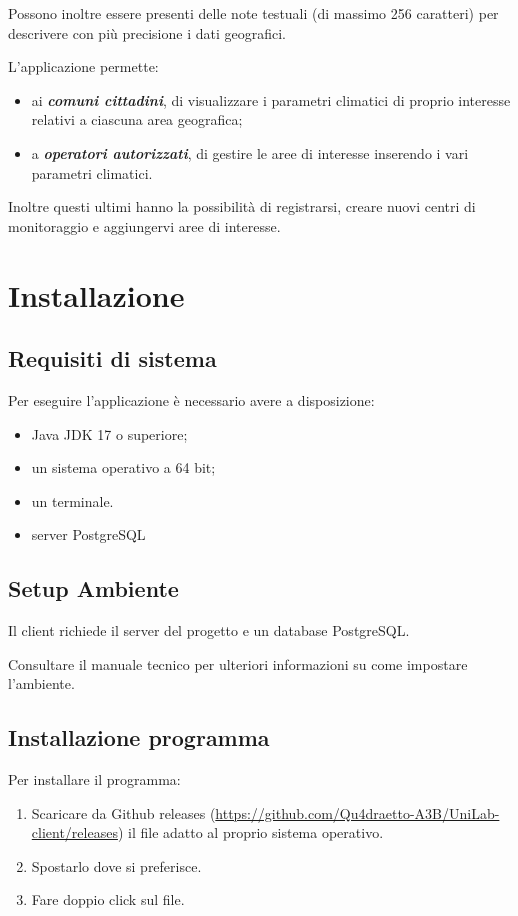 Possono inoltre essere presenti delle note testuali (di massimo 256 caratteri) per descrivere con più precisione i dati geografici.

L'applicazione permette:
\begin{itemize}
	\item ai \textbf{\textsl{comuni cittadini}}, di visualizzare i parametri climatici di proprio interesse relativi a ciascuna area geografica;
	\item a \textbf{\textsl{operatori autorizzati}}, di gestire le aree di interesse inserendo i vari parametri climatici.
\end{itemize}
Inoltre questi ultimi hanno la possibilit\`a di registrarsi, creare nuovi centri di monitoraggio e aggiungervi aree di interesse.

\pagebreak

\chapter{Installazione}
\section{Requisiti di sistema}
Per eseguire l’applicazione \`e necessario avere a disposizione:
\begin{itemize}
	\item Java JDK 17 o superiore;
	\item un sistema operativo a 64 bit;
	\item un terminale.
	\item server PostgreSQL
\end{itemize}

\section{Setup Ambiente}

Il client richiede il server del progetto e un database PostgreSQL.

Consultare il manuale tecnico per ulteriori informazioni su come impostare l'ambiente.

\section{Installazione programma}

Per installare il programma:

\begin{enumerate}
	\item Scaricare da Github releases (\url{https://github.com/Qu4draetto-A3B/UniLab-client/releases}) il file adatto al proprio sistema operativo.
	\item Spostarlo dove si preferisce.
	\item Fare doppio click sul file.
\end{enumerate}


